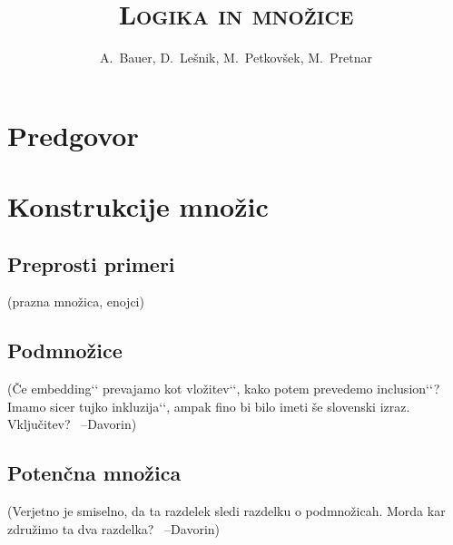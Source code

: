 \documentclass[11pt,a4paper,twoside]{book}
\newcommand{\qt}[1]{{\quotedblbase}{#1}{‘‘}}  %
\newcommand{\davorin}[1]{{\small\textcolor{davorincolor}{(#1 \ \mbox{--Davorin})}}}
\newcommand{\note}[1]{{\small\textcolor{notecolor}{(#1)}}}
\begin{document}


        \title{\Huge \textbf{\textsc{Logika in množice}}}
        \author{A.~Bauer, D.~Lešnik, M.~Petkovšek, M.~Pretnar}

        \maketitle



   \chapter*{Predgovor}%




        \tableofcontents
        \listoftables




        
        
        

        \chapter{Konstrukcije množic}
                \section{Preprosti primeri}
                        \note{prazna množica, enojci}
                \section{Podmnožice}
                        \davorin{Če \qt{embedding} prevajamo kot \qt{vložitev}, kako potem prevedemo \qt{inclusion}? Imamo sicer tujko \qt{inkluzija}, ampak fino bi bilo imeti še slovenski izraz. Vključitev?}
                \section{Potenčna množica}
                        \davorin{Verjetno je smiselno, da ta razdelek sledi razdelku o podmnožicah. Morda kar združimo ta dva razdelka?}
\end{document}
